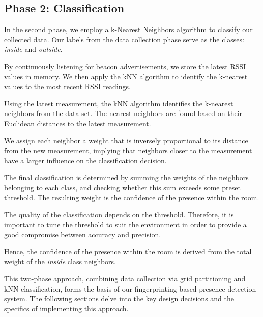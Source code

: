 \subsection{Phase 2: Classification}\label{sec:phase2_classification}
In the second phase, we employ a k-Nearest Neighbors algorithm to classify our collected data. Our labels from the data collection phase serve as the classes: \textit{inside} and \textit{outside}.

By continuously listening for beacon advertisements, we store the latest RSSI values in memory. 
We then apply the kNN algorithm to identify the k-nearest values to the most recent RSSI readings.

Using the latest measurement, the kNN algorithm identifies the k-nearest neighbors from the data set. 
The nearest neighbors are found based on their Euclidean distances to the latest measurement.

We assign each neighbor a weight that is inversely proportional to its distance from the new measurement, implying that neighbors closer to the measurement have a larger influence on the classification decision.

The final classification is determined by summing the weights of the neighbors belonging to each class, and checking whether this sum exceeds some preset threshold.
The resulting weight is the confidence of the presence within the room.



The quality of the classification depends on the threshold.
Therefore, it is important to tune the threshold to suit the environment in order to provide a good compromise between accuracy and precision.

Hence, the confidence of the presence within the room is derived from the total weight of the \textit{inside} class neighbors.

This two-phase approach, combining data collection via grid partitioning and kNN classification, forms the basis of our fingerprinting-based presence detection system.
The following sections delve into the key design decisions and the specifics of implementing this approach.
